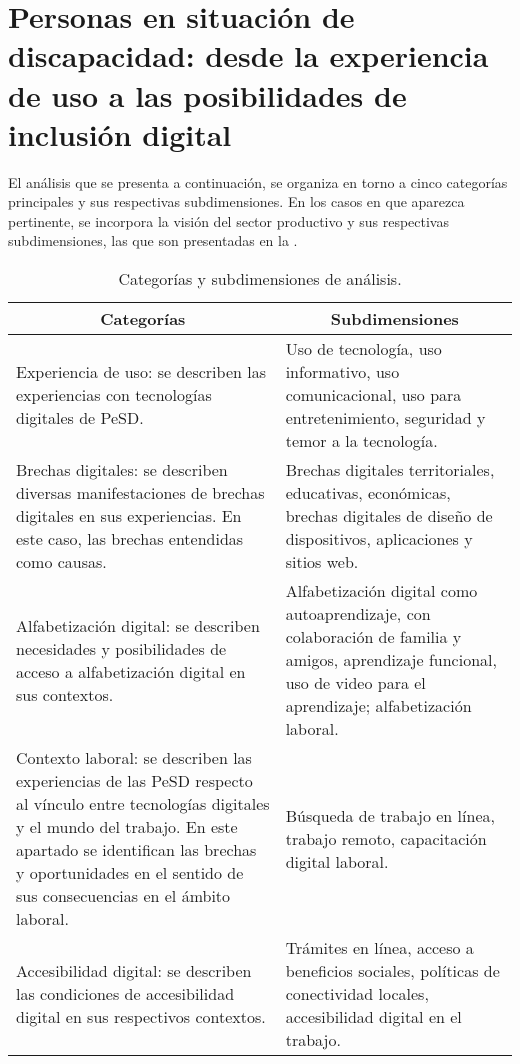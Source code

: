 \section[Personas en situación de discapacidad]{Personas en situación de discapacidad: desde la experiencia de
	uso a las posibilidades de inclusión digital}\label{sec-personasensituacióndediscapacidad}
	
El análisis que se presenta a continuación, se organiza en torno a cinco
categorías principales y sus respectivas subdimensiones. En los casos en
que aparezca pertinente, se incorpora la visión del sector productivo
y sus respectivas subdimensiones, las que son presentadas en la .
	
\begin{table}[htpb]
\centering
\small
\begin{threeparttable}
\caption{Categorías y subdimensiones de análisis.}
\label{tab-03}
\begin{tabular}{p{} p{}}
\toprule
\multicolumn{1}{c}{Categorías} & \multicolumn{1}{c}{Subdimensiones}\\
\midrule
Experiencia de uso: se describen las experiencias con tecnologías
digitales de PeSD. & Uso de tecnología, uso informativo, uso
comunicacional, uso para entretenimiento, seguridad y temor a la
tecnología. \\
Brechas digitales: se describen diversas manifestaciones de brechas
digitales en sus experiencias. En este caso, las brechas entendidas como
causas. & Brechas digitales territoriales, educativas, económicas,
brechas digitales de diseño de dispositivos, aplicaciones y sitios
web. \\
Alfabetización digital: se describen necesidades y posibilidades de
acceso a alfabetización digital en sus contextos. & Alfabetización
digital como autoaprendizaje, con colaboración de familia y amigos,
aprendizaje funcional, uso de video para el aprendizaje; alfabetización
laboral. \\
Contexto laboral: se describen las experiencias de las PeSD respecto al
vínculo entre tecnologías digitales y el mundo del trabajo. En este
apartado se identifican las brechas y oportunidades en el sentido de sus
consecuencias en el ámbito laboral. & Búsqueda de trabajo en línea,
trabajo remoto, capacitación digital laboral. \\
Accesibilidad digital: se describen las condiciones de accesibilidad
digital en sus respectivos contextos. & Trámites en línea, acceso a
beneficios sociales, políticas de conectividad locales, accesibilidad
digital en el trabajo. \\
\bottomrule
\end{tabular}
\end{threeparttable}
\end{table}
	

